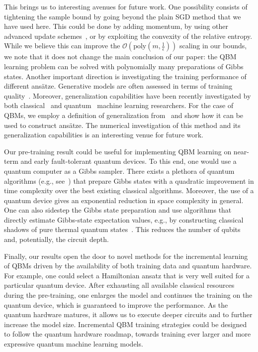 \documentclass[
    aps,
    prx,
    onecolumn
]{revtex4-2}
\begin{document}
This brings us to interesting avenues for future work. One possibility consists of tightening the sample bound by going beyond the plain SGD method that we have used here. This could be done by adding momentum, by using other advanced update schemes~\cite{foster2019complexity, Garrigos2023}, or by exploiting the convexity of the relative entropy. While we believe this can improve the $\mathcal{O}(\mathrm{poly}(m, \frac{1}{\epsilon}))$ scaling in our bounds, we note that it does not change the main conclusion of our paper: the QBM learning problem can be solved with polynomially many preparations of Gibbs states.
Another important direction is investigating the training performance of different ans\"{a}tze. Generative models are often assessed in terms of training quality~\cite{riofrio2023performance}. Moreover, generalization capabilities have been recently investigated by both classical~\cite{zhao2018bias,thanhtung2021generalization} and quantum~\cite{du2022power,gili2023generalization} machine learning researchers. For the case of QBMs, we employ a definition of generalization from~\cite{Aaronson_2007} and show how it can be used to construct ans\"{a}tze. The numerical investigation of this method and its generalization capabilities is an interesting venue for future work.

Our pre-training result could be useful for implementing QBM learning on near-term and early fault-tolerant quantum devices. To this end, one would use a quantum computer as a Gibbs sampler. There exists a plethora of quantum algorithms (e.g., see~\cite{Temme_2011, Chowdhury_2016, Holmes_2022, chifang2023quantum, zhang2023dissipative}) that prepare Gibbs states with a quadratic improvement in time complexity over the best existing classical algorithms. Moreover, the use of a quantum device gives an exponential reduction in space complexity in general. One can also sidestep the Gibbs state preparation and use algorithms that directly estimate Gibbs-state expectation values, e.g., by constructing classical shadows of pure thermal quantum states~\cite{Coopmans_2023}. This reduces the number of qubits and, potentially, the circuit depth.

Finally, our results open the door to novel methods for the incremental learning of QBMs driven by the availability of both training data and quantum hardware. For example, one could select a Hamiltonian ansatz that is very well suited for a particular quantum device. After exhausting all available classical resources during the pre-training, one enlarges the model and continues the training on the quantum device, which is guaranteed to improve the performance. As the quantum hardware matures, it allows us to execute deeper circuits and to further increase the model size. Incremental QBM training strategies could be designed to follow the quantum hardware roadmap, towards training ever larger and more expressive quantum machine learning models.
\end{document}
